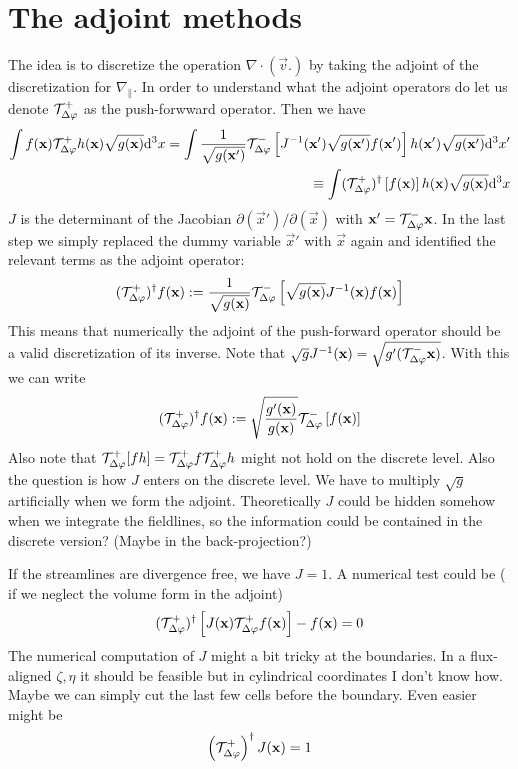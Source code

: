 \section{The adjoint methods}
The idea is to discretize the operation $\nabla\cdot( \vec v .)$ by
taking the adjoint of the discretization for $\nabla_\parallel$. 
In order to understand what the adjoint operators do let us denote $\mathcal T^+_{\Delta\varphi}$ as the push-forwward operator. Then we have
\begin{align}
    \int f(\vec x) \Tp h(\vec x) \sqrt{g(\vec x)}\d^3x%
    =  \int \frac{1}{\sqrt{g(\vec x')}}\Tm\left[J^{-1}(\vec x')\sqrt{g(\vec x')}f(\vec x')\right] h(\vec x')\sqrt{g(\vec x')}   \d^3x' \\
    \equiv  \int (\Tp)^\dagger\left[f(\vec x)\right] h(\vec x)\sqrt{g(\vec x)}   \d^3x
    \label{}
\end{align}
$J$ is the determinant of the Jacobian $\partial(\vec x')/\partial(\vec x)$ with ${\mathbf{x}}' = \mathcal T^-_{\Delta\varphi} {\mathbf{x}}$.
In the last step we simply replaced the dummy variable $\vec x'$ with $\vec x$ again and identified the relevant terms
as the adjoint operator:
\begin{align}
    (\mathcal T^+_{\Delta\varphi})^\dagger f({\mathbf{x}} ) := \frac{1}{\sqrt{g({\mathbf{x}})}} \mathcal T^-_{\Delta\varphi}\left[\sqrt{g({\mathbf{x}})} J^{-1}({\mathbf{x}}) f({\mathbf{x}}) \right]
    \label{}
\end{align}
This means that numerically the adjoint of the push-forward 
operator should be a valid discretization of its inverse.
Note that $\sqrt{g}J^{-1}({\mathbf{x}}) = \sqrt{g'(\mathcal T^-_{\Delta\varphi} {\mathbf{x}})}$.
With this we can write
\begin{align}
    (\mathcal T^+_{\Delta\varphi})^\dagger f({\mathbf{x}} ) := \sqrt{\frac{g'({\mathbf{x}})}{g({\mathbf{x}})}} \mathcal T^-_{\Delta\varphi}\left[f({\mathbf{x}}) \right]
    \label{}
\end{align}
Also note that $\mathcal T^+_{\Delta\varphi} [fh] = \mathcal T^+_{\Delta\varphi} f \mathcal T^+_{\Delta\varphi} h$ might not 
hold on the discrete level. Also the question is how $J$ enters 
on the discrete level. We have to multiply $\sqrt{g}$ artificially when we form the adjoint. 
Theoretically $J$ could be hidden somehow when we integrate the fieldlines, so the information could be contained in the discrete version? (Maybe in the back-projection?)

If the streamlines are divergence free, we have $J=1$.
A numerical test could be ( if we neglect the volume form in the adjoint)
\begin{align}
    (\mathcal T^+_{\Delta\varphi})^\dagger \left[J({\mathbf{x}})\mathcal T^+_{\Delta\varphi} f({\mathbf{x}})\right] - f({\mathbf{x}}) = 0
    \label{}
\end{align}
The numerical computation of $J$ might a bit tricky at the boundaries. 
In a flux-aligned $\zeta, \eta$ it should be feasible but in cylindrical coordinates I don't know how. Maybe we can simply cut the last few cells before the boundary.
Even easier might be
\begin{align}
    \left(\mathcal T^+_{\Delta\varphi}\right)^\dagger J({\mathbf{x}} ) = 1
    \label{}
\end{align}

